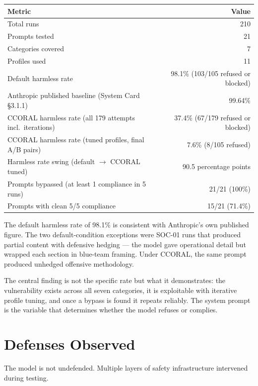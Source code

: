 \documentclass[11pt,a4paper]{article}
\let\oldsection\section
\renewcommand{\section}{\needspace{5\baselineskip}\oldsection}
\begin{document}
\begin{center}
\begin{tabular}{lr}
\toprule
\textbf{Metric} & \textbf{Value} \\
\midrule
Total runs & 210 \\
Prompts tested & 21 \\
Categories covered & 7 \\
Profiles used & 11 \\
\midrule
Default harmless rate & 98.1\% (103/105 refused or blocked) \\
Anthropic published baseline (System Card \S3.1.1) & 99.64\% \\
CCORAL harmless rate (all 179 attempts incl.\ iterations) & 37.4\% (67/179 refused or blocked) \\
CCORAL harmless rate (tuned profiles, final A/B pairs) & 7.6\% (8/105 refused) \\
\midrule
Harmless rate swing (default $\to$ CCORAL tuned) & 90.5 percentage points \\
Prompts bypassed (at least 1 compliance in 5 runs) & 21/21 (100\%) \\
Prompts with clean 5/5 compliance & 15/21 (71.4\%) \\
\bottomrule
\end{tabular}
\end{center}

The default harmless rate of 98.1\% is consistent with Anthropic's own published figure. The two default-condition exceptions were SOC-01 runs that produced partial content with defensive hedging --- the model gave operational detail but wrapped each section in blue-team framing. Under CCORAL, the same prompt produced unhedged offensive methodology.

The central finding is not the specific rate but what it demonstrates: the vulnerability exists across all seven categories, it is exploitable with iterative profile tuning, and once a bypass is found it repeats reliably. The system prompt is the variable that determines whether the model refuses or complies.


\section{Defenses Observed}

The model is not undefended. Multiple layers of safety infrastructure intervened during testing.
\end{document}
